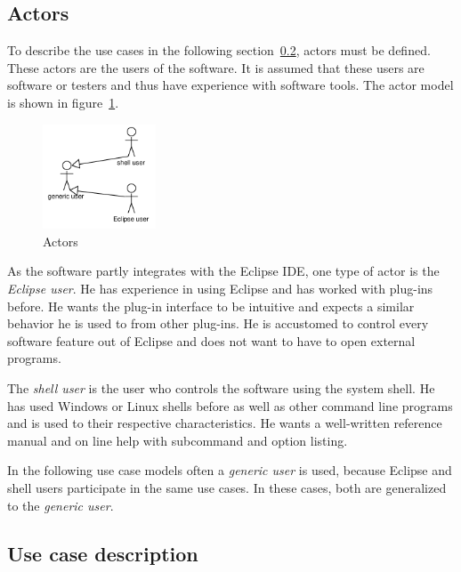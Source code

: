 \subsection{Actors} \label{fr:Actors}
To describe the use cases in the following section~\ref{fr:Use case description}, actors must be defined. These actors are the users of the software. It is assumed that these users are software  or testers and thus have experience with software tools. The actor model is shown in figure~\ref{fr_fg:Actors}.
\begin{figure}[htp]
 \centering
 \includegraphics[width=0.3\textwidth]{images/Use_Case_Models/actors}
 \caption{Actors}
 \label{fr_fg:Actors}
\end{figure}
\par
As the software partly integrates with the Eclipse IDE, one type of actor is the \textit{Eclipse user}. He has experience in using Eclipse and has worked with plug-ins before. He wants the plug-in interface to be intuitive and expects a similar behavior he is used to from other plug-ins. He is accustomed to control every software feature out of Eclipse and does not want to have to open external programs.
\par
The \textit{shell user} is the user who controls the software using the system shell. He has used Windows or Linux shells before as well as other command line programs and is used to their respective characteristics. He wants a well-written reference manual and on line help with subcommand and option listing.
\par
In the following use case models often a \textit{generic user} is used, because Eclipse and shell users participate in the same use cases. In these cases, both are generalized to the \textit{generic user}.

\subsection{Use case description} \label{fr:Use case description}
